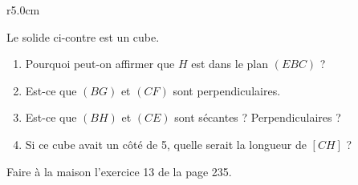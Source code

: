 
\begin{exercice}\label{exoSeconde-0087}

\begin{wrapfigure}{r}{5.0cm}
    \vspace{-1cm}
    \centering
    
\end{wrapfigure}

        Le solide ci-contre est un cube. 
        \begin{enumerate}
            \item
                Pourquoi peut-on affirmer que \( H\) est dans le plan \( (EBC)\) ?
            \item
                Est-ce que \( (BG)\) et \( (CF)\) sont perpendiculaires.
            \item
                Est-ce que \( (BH)\) et \( (CE)\) sont sécantes ? Perpendiculaires ?
            \item
                Si ce cube avait un côté de \unit{5}{\centi\meter}, quelle serait la longueur de \( [CH]\) ?
        \end{enumerate}

        Faire à la maison l'exercice 13 de la page 235.

\end{exercice}

